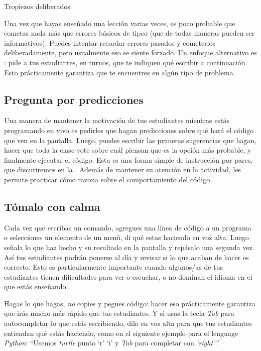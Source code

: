 \begin{aside}{Tropiezos deliberados}
  
  Una vez que hayas enseñado una lección varias veces,
  es poco probable que cometas nada más que errores básicos de tipeo
  (que de todas maneras pueden ser informativos).
  Puedes intentar recordar errores pasados y cometerlos deliberadamente,
  pero usualmente eso se siente forzado.
  Un enfoque alternativo es :
  pide a tus estudiantes, en turnos, que te indiquen qué escribir a continuación.
  Esto prácticamente garantiza que te encuentres en algún tipo de problema.
\end{aside}

\subsection*{Pregunta por predicciones}

Una manera de mantener la motivación de tus estudiantes mientras estás programando en vivo
es pedirles que hagan predicciones sobre qué hará el código que ven en la pantalla.
Luego, puedes escribir las primeras sugerencias que hagan,
hacer que toda la clase vote sobre cuál piensan que es la opción más probable,
y finalmente ejecutar el código.
Esta es una forma simple de instrucción por pares,
que discutiremos en la .
Además de mantener su atención en la actividad,
les permite practicar cómo razona sobre el comportamiento del código.

\subsection*{Tómalo con calma}

Cada vez que escribas un comando,
agregues una línea de código a un programa
o selecciones un elemento de un menú,
di qué estas haciendo en voz alta.
Luego señala lo que haz hecho y su resultado en la pantalla
y repásalo una segunda vez.
Así tus estudiantes podrán ponerse al día
y revisar si lo que acaban de hacer es correcto.
Esto es particularmente importante cuando algunos/as de tus estudiantes tienen 
dificultades para ver o escuchar, o no dominan el idioma en el que estás enseñando.

Hagas lo que hagas,
\emph{no} copies y pegues código:
hacer eso prácticamente garantiza que irás mucho más rápido que tus estudiantes.
Y si usas la tecla \emph{Tab} para autocompletar lo que estás escribiendo,
dilo en voz alta para que tus estudiantes entiendan qué estás haciendo, 
como en el siguiente ejemplo para el lenguage \emph{Python}:
``Usemos \emph{turtle} punto `r' `i' y \emph{Tab} para completar con \emph{`right'}.''

